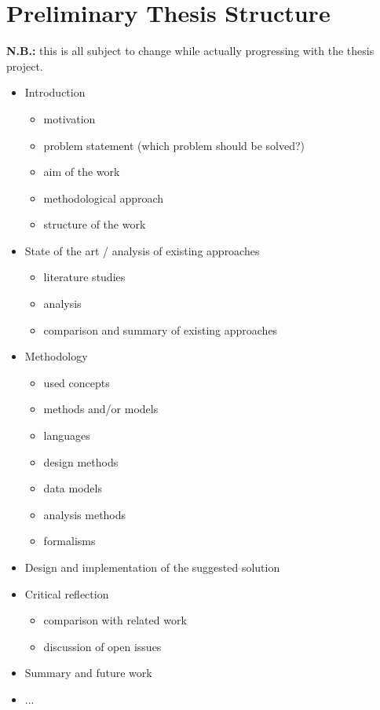 \section{Preliminary Thesis Structure}

\textbf{N.B.: }this is all subject to change while actually progressing with the thesis project.

\begin{itemize}
  \item Introduction
  	\begin{itemize}
  		\item motivation
  		\item problem statement (which problem should be solved?)
  		\item aim of the work
  		\item methodological approach
  		\item structure of the work
  	\end{itemize}
  \item State of the art / analysis of existing approaches
  	\begin{itemize}
  		\item literature studies
  		\item analysis
  		\item comparison and summary of existing approaches
  	\end{itemize}
  \item Methodology
  	\begin{itemize}
  		\item used concepts
  		\item methods and/or models
  		\item languages
  		\item design methods
  		\item data models
  		\item analysis methods
  		\item formalisms
  	\end{itemize}
  \item Design and implementation of the suggested solution
  \item Critical reflection
  	\begin{itemize}
  		\item comparison with related work
  		\item discussion of open issues
  	\end{itemize}
  \item Summary and future work
  \item ...
\end{itemize}
